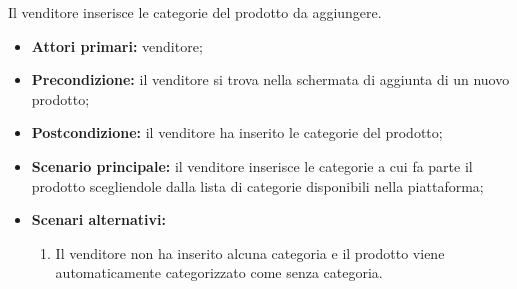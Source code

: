 Il venditore inserisce le categorie del prodotto da aggiungere.
\begin{itemize}
    \item \textbf{Attori primari:} venditore;
    \item \textbf{Precondizione:} il venditore si trova nella schermata di aggiunta di un nuovo prodotto;
    \item \textbf{Postcondizione:} il venditore ha inserito le categorie del prodotto;
    \item \textbf{Scenario principale:} il venditore inserisce le categorie a cui fa parte il prodotto scegliendole dalla lista di categorie disponibili nella piattaforma;
    \item \textbf{Scenari alternativi:}
    \begin{enumerate}[label=\lett]
    	\item Il venditore non ha inserito alcuna categoria e il prodotto viene automaticamente categorizzato come senza categoria. %
    \end{enumerate}
\end{itemize}

